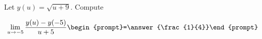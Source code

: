 \documentclass{ximera}
\author{Bart Snapp}
\begin{document}
\begin{exercise}
Let $y(u) = \sqrt{u+9}$. Compute

\[
\lim_{ u\to -5 } 
\frac{y(u)-y(-5)}{u+5} \begin{prompt}=\answer{\frac{1}{4}}\end{prompt}
\]
\end{exercise}
\end{document}
